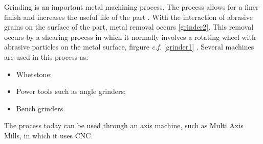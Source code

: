 Grinding is an important metal machining process. The process allows for a finer finish and increases the useful life of the part \cite{el2018fundamentals,malkin1984grinding}.
With the interaction of abrasive grains on the surface of the part, metal removal occurs \ref{grinder2}. This removal occurs by a shearing process in which it normally involves a rotating wheel with abrasive particles on the metal surface, firgure \textit{c.f.} \ref{grinder1} \cite{el2018fundamentals,malkin1984grinding}. Several machines are used in this process as:
\begin{itemize}
    \item Whetstone;
    \item Power tools such as angle grinders;
    \item Bench grinders.
\end{itemize}

The process today can be used through an axis machine, such as Multi Axis Mills, in which it uses \ac{CNC}.

